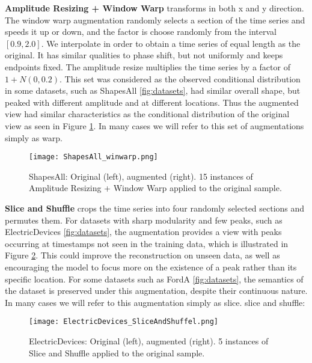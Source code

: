 \documentclass[../../thesis.tex]{subfiles}
\begin{document}
\textbf{Amplitude Resizing + Window Warp} transforms in both x and y direction. The window warp augmentation randomly selects a section of the time series and speeds it up or down, and the factor is choose randomly from the interval $[0.9, 2.0]$. We interpolate in order to obtain a time series of equal length as the original. It has similar qualities to phase shift, but not uniformly and keeps endpoints fixed. The amplitude resize multiplies the time series by a factor of $1+N(0,0.2)$. This set was considered as the observed conditional distribution in some datasets, such as ShapesAll \ref{fig:datasets}, had similar overall shape, but peaked with different amplitude and at different locations. Thus the augmented view had similar characteristics as the conditional distribution of the original view as seen in Figure \ref{fig:ShapesAll_winwarp}. In many cases we will refer to this set of augmentations simply as warp. \newline

\begin{figure}[h]
    \centering
    \texttt{[image: ShapesAll\_winwarp.png]}
    \caption{ShapesAll: Original (left), augmented (right). 15 instances of Amplitude Resizing + Window Warp applied to the original sample.}
    \label{fig:ShapesAll_winwarp}
\end{figure}

\textbf{Slice and Shuffle} crops the time series into four randomly selected sections and permutes them. For datasets with sharp modularity and few peaks, such as ElectricDevices \ref{fig:datasets}, the augmentation provides a view with peaks occurring at timestamps not seen in the training data, which is illustrated in Figure \ref{fig:ElectricDevices_SliceAndShuffel}. This could improve the reconstruction on unseen data, as well as encouraging the model to focus more on the existence of a peak rather than its specific location. For some datasets such as FordA \ref{fig:datasets}, the semantics of the dataset is preserved under this augmentation, despite their continuous nature. In many cases we will refer to this augmentation simply as slice.\newline
slice and shuffle:
\begin{figure}[h]
    \texttt{[image: ElectricDevices\_SliceAndShuffel.png]}
    \centering
    \caption{ElectricDevices: Original (left), augmented (right). 5 instances of Slice and Shuffle applied to the original sample.}
    \label{fig:ElectricDevices_SliceAndShuffel}
\end{figure}
\end{document}
